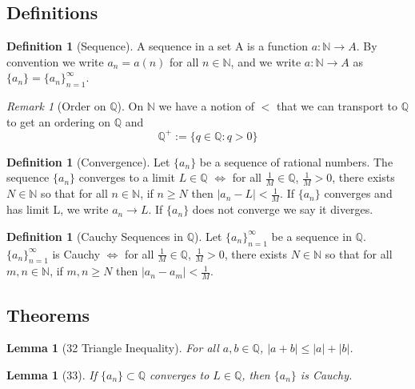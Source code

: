 \documentclass[12pt]{article}
\newtheorem{lem}[thm]{Lemma}  %
\theoremstyle{definition}
\newtheorem{defn}[thm]{Definition}
\theoremstyle{remark}
\newtheorem{rmk}[thm]{Remark}
\numberwithin{equation}{section}
\newcommand\N{\mathbb N}    %
\newcommand\Q{\mathbb Q}    %
\begin{document}
\subsection{Definitions}

\begin{defn}[Sequence]
        A sequence in a set A is a function $a:\N \rightarrow A$. By convention we write $a_n = a(n)$ for all $n \in \N$, and we write $a:\N \rightarrow A$ as $\{a_n\} = \{a_n\}_{n=1}^{\infty}$.
\end{defn}


\begin{rmk}[Order on $\Q$]
        On $\N$ we have a notion of $<$ that we can transport to $\Q$ to get an ordering on $\Q$ and $$\Q^+ := \{q \in \Q: q > 0\}$$
\end{rmk}


\begin{defn}[Convergence]
        Let $\{a_n\}$ be a sequence of rational numbers. The sequence $\{a_n\}$ converges to a limit $L \in \Q$ $\iff$ for all $\frac{1}{M} \in \Q$, $\frac{1}{M} > 0$, there exists $N \in \N$ so that for all $n \in \N$, if $n \geq N$ then $|a_n - L| < \frac{1}{M}$. If $\{a_n\}$ converges and has limit L, we write $a_n\rightarrow L$. If $\{a_n\}$ does not converge we say it diverges.
\end{defn}



\begin{defn}[Cauchy Sequences in $\Q$]
        Let $\{a_n\}_{n=1}^{\infty}$ be a sequence in $\Q$. $\{a_n\}_{n=1}^{\infty}$ is Cauchy $\iff$ for all $\frac{1}{M} \in \Q$, $\frac{1}{M} > 0$, there exists $N \in \N$ so that for all $m,n \in \N$, if $m,n \geq N$ then $|a_n - a_m| < \frac{1}{M}$.
\end{defn}








\subsection{Theorems}

\begin{lem}[32 Triangle Inequality]
        For all $a,b \in \Q$, $|a+b| \leq |a| + |b|$.
\end{lem}


\begin{lem}[33]
        If $\{a_n\}\subset \Q$ converges to $L \in \Q$, then $\{a_n\}$ is Cauchy.
\end{lem}
\end{document}
